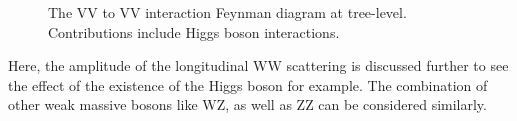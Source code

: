 \begin{figure}[tbp]
\begin{center}
\caption{
The VV to VV interaction Feynman diagram at tree-level. Contributions include Higgs boson interactions.
}
\label{fig:VBSHiggs}
\end{center}
\end{figure}


Here, the amplitude of the longitudinal WW scattering is discussed further to see the effect of the existence of the Higgs boson for example. The combination of other weak massive bosons like WZ, as well as ZZ can be considered similarly. 

